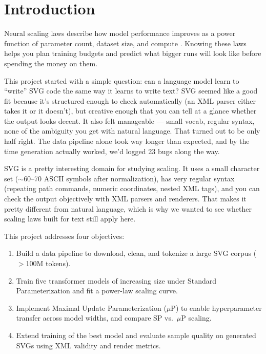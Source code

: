 \documentclass[10pt,letterpaper]{article}
\begin{document}
\section{Introduction}
\label{sec:intro}

Neural scaling laws describe how model performance improves as a power function of parameter count, dataset size, and compute \cite{kaplan2020scaling,hoffmann2022chinchilla}. Knowing these laws helps you plan training budgets and predict what bigger runs will look like before spending the money on them.

This project started with a simple question: can a language model learn to ``write'' SVG code the same way it learns to write text? SVG seemed like a good fit because it's structured enough to check automatically (an XML parser either takes it or it doesn't), but creative enough that you can tell at a glance whether the output looks decent. It also felt manageable — small vocab, regular syntax, none of the ambiguity you get with natural language. That turned out to be only half right. The data pipeline alone took way longer than expected, and by the time generation actually worked, we'd logged 23 bugs along the way.

SVG is a pretty interesting domain for studying scaling. It uses a small character set ($\sim$60–70 ASCII symbols after normalization), has very regular syntax (repeating path commands, numeric coordinates, nested XML tags), and you can check the output objectively with XML parsers and renderers. That makes it pretty different from natural language, which is why we wanted to see whether scaling laws built for text still apply here.

This project addresses four objectives:
\begin{enumerate}[leftmargin=*, nosep]
  \item Build a data pipeline to download, clean, and tokenize a large SVG
    corpus ($>$100M tokens).
  \item Train five transformer models of increasing size under Standard
    Parameterization and fit a power-law scaling curve.
  \item Implement Maximal Update Parameterization ($\mu$P) to enable
    hyperparameter transfer across model widths, and compare SP vs.\ $\mu$P
    scaling.
  \item Extend training of the best model and evaluate sample quality on
    generated SVGs using XML validity and render metrics.
\end{enumerate}
\end{document}

